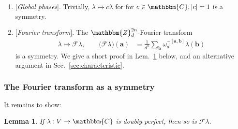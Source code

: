 \documentclass[aps,nofootinbib,floatfix,a4paper]{revtex4}
\newtheorem{lemma}[theorem]{Lemma}
\newcommand{\1}{\mbox{$\mathbf{1}$}}
\def\ZZ{\mathbbm{Z}}
\def\CC{\mathbbm{C}}
\def\F{\mathcal{F}}
\renewcommand{\vec}{\mathbf}
\begin{document}
\begin{enumerate}
	\item
		{}[\emph{Global phases}].
		Trivially, $\lambda \mapsto c \lambda$ for for $c\in\CC, |c|=1$ is a symmetry.

	\item
		{}[\emph{Fourier transform}].
		The $\ZZ_d^{2n}$-Fourier transform
		\begin{align*}
			\lambda \mapsto \mathcal{F} \lambda,
			\qquad
			\big(\mathcal{F}\lambda)(\vec a)
				&=
				\frac1{d^n} 
				\sum_{\vec b}
				\omega_d^{-[\vec a, \vec b]} \lambda(\vec b)
		\end{align*}
		is a symmetry.
		We give a short proof in Lem.~\ref{lem:ft_sym} below, and an alternative argument in Sec.~\ref{sec:characteristic}.
\end{enumerate}

%

\subsubsection{The Fourier transform as a symmetry}

It remains to show:

\begin{lemma}\label{lem:ft_sym}
	If $\lambda: V\to\CC$ is doubly perfect, then so is $\F \lambda$.
\end{lemma}
\end{document}

